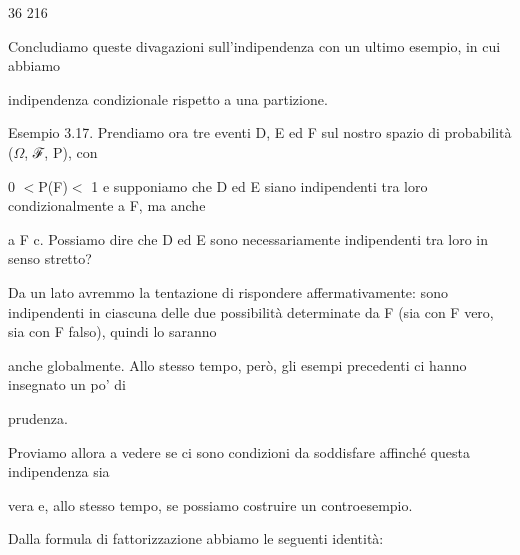 \documentclass[a4paper,portrait,12pt]{article}
\begin{document}
36 216





\begin{flushleft}
Concludiamo queste divagazioni sull'indipendenza con un ultimo esempio, in cui abbiamo
\end{flushleft}


\begin{flushleft}
indipendenza condizionale rispetto a una partizione.
\end{flushleft}


\begin{flushleft}
Esempio 3.17. Prendiamo ora tre eventi D, E ed F sul nostro spazio di probabilit\`{a} ($\Omega$, ℱ, P), con
\end{flushleft}


\begin{flushleft}
0 $<$P(F)$<$ 1 e supponiamo che D ed E siano indipendenti tra loro condizionalmente a F, ma anche
\end{flushleft}


\begin{flushleft}
a F c. Possiamo dire che D ed E sono necessariamente indipendenti tra loro in senso stretto?
\end{flushleft}


\begin{flushleft}
Da un lato avremmo la tentazione di rispondere affermativamente: sono indipendenti in ciascuna delle due possibilit\`{a} determinate da F (sia con F vero, sia con F falso), quindi lo saranno
\end{flushleft}


\begin{flushleft}
anche globalmente. Allo stesso tempo, per\`{o}, gli esempi precedenti ci hanno insegnato un po' di
\end{flushleft}


\begin{flushleft}
prudenza.
\end{flushleft}


\begin{flushleft}
Proviamo allora a vedere se ci sono condizioni da soddisfare affinch\'{e} questa indipendenza sia
\end{flushleft}


\begin{flushleft}
vera e, allo stesso tempo, se possiamo costruire un controesempio.
\end{flushleft}


\begin{flushleft}
Dalla formula di fattorizzazione abbiamo le seguenti identit\`{a}:
\end{flushleft}
\end{document}
